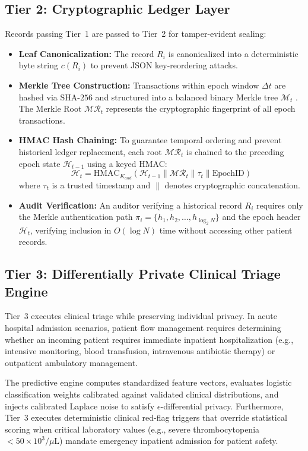 \documentclass[conference]{IEEEtran}
\begin{document}
\subsection{Tier 2: Cryptographic Ledger Layer}
Records passing Tier~1 are passed to Tier~2 for tamper-evident sealing:
\begin{itemize}
    \item \textbf{Leaf Canonicalization:} The record $R_i$ is canonicalized into a deterministic byte string $c(R_i)$ to prevent JSON key-reordering attacks.
    \item \textbf{Merkle Tree Construction:} Transactions within epoch window $\Delta t$ are hashed via $\text{SHA-256}$ and structured into a balanced binary Merkle tree $\mathcal{M}_t$ \cite{merkle1987digital}. The Merkle Root $\mathcal{MR}_t$ represents the cryptographic fingerprint of all epoch transactions.
    \item \textbf{HMAC Hash Chaining:} To guarantee temporal ordering and prevent historical ledger replacement, each root $\mathcal{MR}_t$ is chained to the preceding epoch state $\mathcal{H}_{t-1}$ using a keyed HMAC:
    \begin{equation}
        \mathcal{H}_t = \text{HMAC}_{K_{aud}}\left(\mathcal{H}_{t-1} \parallel \mathcal{MR}_t \parallel \tau_t \parallel \text{EpochID}\right)
        \label{eq:chaining}
    \end{equation}
    where $\tau_t$ is a trusted timestamp and $\parallel$ denotes cryptographic concatenation.
    \item \textbf{Audit Verification:} An auditor verifying a historical record $R_i$ requires only the Merkle authentication path $\pi_i = \{h_1, h_2, \dots, h_{\log_2 N}\}$ and the epoch header $\mathcal{H}_t$, verifying inclusion in $O(\log N)$ time without accessing other patient records.
\end{itemize}

\subsection{Tier 3: Differentially Private Clinical Triage Engine}
Tier~3 executes clinical triage while preserving individual privacy. In acute hospital admission scenarios, patient flow management requires determining whether an incoming patient requires immediate inpatient hospitalization (e.g., intensive monitoring, blood transfusion, intravenous antibiotic therapy) or outpatient ambulatory management.

The predictive engine computes standardized feature vectors, evaluates logistic classification weights calibrated against validated clinical distributions, and injects calibrated Laplace noise to satisfy $\epsilon$-differential privacy. Furthermore, Tier~3 executes deterministic clinical red-flag triggers that override statistical scoring when critical laboratory values (e.g., severe thrombocytopenia $<50\times 10^3/\mu\text{L}$) mandate emergency inpatient admission for patient safety.
\end{document}
